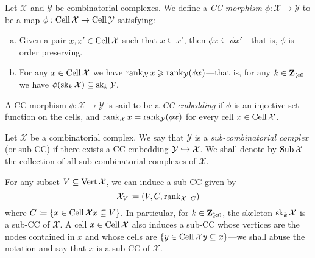 \begin{definition}
\label{def:cc-morphism}
Let \(\mathcal{X}\) and \(\mathcal{Y}\) be combinatorial complexes. We define a \emph{CC-morphism}
\(\phi: \mathcal{X} \to \mathcal{Y}\) to be a map \(\phi: \operatorname{Cell} \mathcal{X} \to \operatorname{Cell} \mathcal{Y}\) satisfying:
\begin{enumerate}[(a)]\setlength\itemsep{0em}
\item Given a pair \(x, x' \in \operatorname{Cell} \mathcal{X}\) such that \(x \subseteq x'\), then \(\phi x \subseteq \phi
  x'\)---that is, \(\phi\) is order preserving.
\item For any \(x \in \operatorname{Cell} \mathcal{X}\) we have
  \(\operatorname{rank}_{\mathcal{X}} x \geqslant \operatorname{rank}_{\mathcal{Y}}(\phi x)\)---that is, for any
  \(k \in \mathbf{Z}_{\geqslant 0}\) we have \(\phi(\operatorname{sk}_k \mathcal{X}) \subseteq \operatorname{sk}_k \mathcal{Y}\).
\end{enumerate}
\end{definition}

\begin{definition}
\label{def:cc-embedding}
A CC-morphism \(\phi: \mathcal{X} \to \mathcal{Y}\) is said to be a \emph{CC-embedding} if
\(\phi\) is an injective set function on the cells, and
\(\operatorname{rank}_{\mathcal{X}} x = \operatorname{rank}_{\mathcal{Y}}(\phi x)\) for every cell \(x \in \operatorname{Cell} \mathcal{X}\).
\end{definition}

\begin{definition}
\label{def:sub-combinatorial-complex}
Let \(\mathcal{X}\) be a combinatorial complex. We say that \(\mathcal{Y}\) is a
\emph{sub-combinatorial complex} (or sub-CC) if there exists a CC-embedding
\(\mathcal{Y} \hookrightarrow \mathcal{X}\). We shall denote by \(\operatorname{Sub} \mathcal{X}\) the collection of all
sub-combinatorial complexes of \(\mathcal{X}\).
\end{definition}

\begin{example}
\label{exp:sub-cc}
For any subset \(V \subseteq \operatorname{Vert} \mathcal{X}\), we can induce a sub-CC given by
\[
\mathcal{X}_V \coloneq (V, C, \operatorname{rank}_{\mathcal{X}}|_C)
\]
where \(C \coloneq \{x \in \operatorname{Cell} \mathcal{X} \relax x \subseteq V\}\). In particular, for
\(k \in \mathbf{Z}_{\geqslant 0}\), the skeleton \(\operatorname{sk}_k \mathcal{X}\) is a sub-CC of \(\mathcal{X}\). A cell \(x \in
\operatorname{Cell} \mathcal{X}\) also induces a sub-CC whose vertices are the nodes contained in \(x\)
and whose cells are \(\{y \in \operatorname{Cell} \mathcal{X} \relax y \subseteq x\}\)---we shall abuse the notation
and say that \(x\) is a sub-CC of \(\mathcal{X}\).
\end{example}

